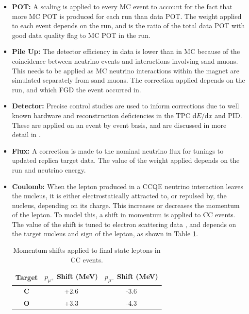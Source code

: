 \begin{itemize}

\item \textbf{POT: } A scaling is applied to every MC event to account for the fact that more MC POT is produced for each run than data POT. The weight applied to each event depends on the run, and is the ratio of the total data POT with good data quality flag to MC POT in the run.

\item \textbf{Pile Up: } The detector efficiency in data is lower than in MC because of the coincidence between neutrino events and interactions involving sand muons. This needs to be applied as MC neutrino interactions within the magnet are simulated separately from sand muons. The correction applied depends on the run, and which FGD the event occurred in.

\item \textbf{Detector: } Precise control studies are used to inform corrections due to well known hardware and reconstruction deficiencies in the TPC d$E/$d$x$ and PID. These are applied on an event by event basis, and are discussed in more detail in \cite{tn212}.

\item \textbf{Flux: } A correction is made to the nominal neutrino flux for tunings to updated replica target data. The value of the weight applied depends on the run and neutrino energy.

\item \textbf{Coulomb: } When the lepton produced in a CCQE neutrino interaction leaves the nucleus, it is either electrostatically attracted to, or repulsed by, the nucleus, depending on its charge. This increases or decreases the momentum of the lepton. To model this, a shift in momentum is applied to CC events. The value of the shift is tuned to electron scattering data \cite{coulombcorr}, and depends on the target nucleus and sign of the lepton, as shown in Table \ref{tab:coulomb}.

\begin{center}
\begin{table}
\center
\begin{tabular}{ c||c|c}
\hline
\hline
\textbf{Target} & \textbf{$p_{\mu^{+}}$ Shift (MeV)} & \textbf{$p_{\mu^{-}}$ Shift (MeV)} \\
\hline
\hline
\textbf{C} & +2.6 & -3.6\\
\textbf{O} & +3.3 & -4.3\\ 
\hline
\hline
\end{tabular}
\caption{Momentum shifts applied to final state leptons in CC events.}
\label{tab:coulomb}
\end{table}
\end{center}

\end{itemize}

